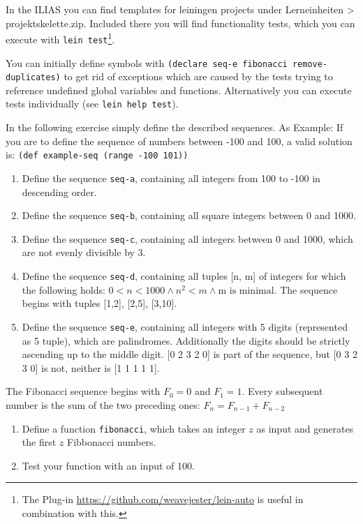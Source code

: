 \documentclass[11pt,a4paper]{article}
\begin{document}
In the ILIAS you can find templates for leiningen projects under Lerneinheiten > projektskelette.zip.
Included there you will find functionality tests, which you can execute with \verb|lein test|\footnote{The Plug-in \url{https://github.com/weavejester/lein-auto} is useful in combination with this.}.

You can initially define symbols with \verb|(declare seq-e fibonacci remove-duplicates)|
to get rid of exceptions which are caused by the tests trying to reference undefined global variables and functions.
Alternatively you can execute tests individually (see \verb|lein help test|).

\begin{exercise}[Sequences]

In the following exercise simply define the described sequences. As Example: If you are to define the sequence of numbers between -100 and 100, a valid solution is: \texttt{(def example-seq (range -100 101))}
  

\begin{enumerate}[label=\alph*)]
  \item Define the sequence \verb|seq-a|, containing all integers from 100 to -100 in descending order.
  \item Define the sequence \verb|seq-b|, containing all square integers between 0 and 1000.
  \item Define the sequence \verb|seq-c|, containing all integers between 0 and 1000, which are not evenly divisible by 3.
  \item Define the sequence \verb|seq-d|, containing all tuples [n, m] of integers for which the following holds: $0 < n < 1000 \wedge n^2 < m \wedge \text{m is minimal}$.  The sequence begins with tuples [1,2], [2,5], [3,10].
  \item Define the sequence \verb|seq-e|, containing all integers with 5 digits (represented as 5 tuple), which are palindromes. Additionally the digits should be strictly ascending up to the middle digit. [0 2 3 2 0] is part of the sequence, but [0 3 2 3 0] is not, neither is [1 1 1 1 1].
  
    
  \end{enumerate}
\end{exercise}

\begin{exercise}[Fibonacci]
The Fibonacci sequence begins with $F_0=0$ and $F_1=1$. Every subsequent number is the sum of the two preceding ones: $F_{n}=F_{n-1}+F_{n-2}$ 
\begin{enumerate}[label=\alph*)]
  \item Define a function \verb|fibonacci|, which takes an integer $z$ as input and generates the first $z$ Fibbonacci numbers.
  \item Test your function with an input of 100.
  \end{enumerate}
\end{exercise}
\end{document}
